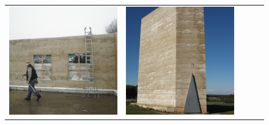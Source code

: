 \begin{figure}[H]
{\begin{tabular}{@{}ccccc@{}}
      \includegraphics[width=\linewidth]{Images/LoRAs/STAMPBETON/Training_images/3.jpg} &
      \includegraphics[width=\linewidth]{Images/LoRAs/STAMPBETON/Training_images/4.jpg} &

\end{tabular}}
\end{figure}
